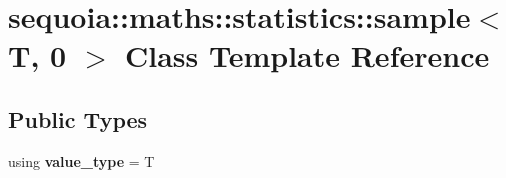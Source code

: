 \hypertarget{classsequoia_1_1maths_1_1statistics_1_1sample_3_01_t_00_010_01_4}{}\section{sequoia\+::maths\+::statistics\+::sample$<$ T, 0 $>$ Class Template Reference}
\label{classsequoia_1_1maths_1_1statistics_1_1sample_3_01_t_00_010_01_4}
\subsection*{Public Types}
\begin{DoxyCompactItemize}
\item 
\mbox{\label{classsequoia_1_1maths_1_1statistics_1_1sample_3_01_t_00_010_01_4_a62a1b2b09261ccef21ba9dd196535377}} 
using {\bfseries value\+\_\+type} = T
\end{DoxyCompactItemize}
